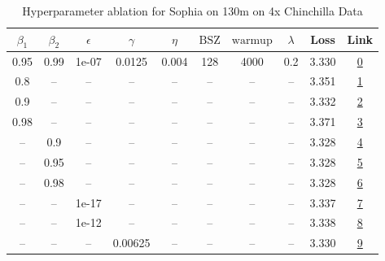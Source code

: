 \begin{table}[H]
\centering
\caption{Hyperparameter ablation for Sophia on 130m on 4x Chinchilla Data}
\label{tab:ablation_sophia_130m_4}
\begin{tabular}{cccccccccc}
\toprule
$\beta_1$ & $\beta_2$ & $\epsilon$ & $\gamma$ & $\eta$ & $\mathrm{BSZ}$ & $\mathrm{warmup}$ & $\lambda$ & Loss & Link \\
\midrule
0.95 & 0.99 & 1e-07 & 0.0125 & 0.004 & 128 & 4000 & 0.2 & 3.330 & \href{https://wandb.ai/stanford-mercury/optimizer-scaling/runs/sweep-130m-10B-sophia420680lr0.004-wd0.2-minlr0-warmup4000-b10.9-95e0d1}{0} \\
\midrule
0.8 & -- & -- & -- & -- & -- & -- & -- & 3.351 & \href{https://wandb.ai/stanford-mercury/optimizer-scaling/runs/sweep-130m-10B-sophiam200bcelr0.004-wd0.2-minlr0-warmup4000-b10.-64829e}{1} \\
0.9 & -- & -- & -- & -- & -- & -- & -- & 3.332 & \href{https://wandb.ai/stanford-mercury/optimizer-scaling/runs/sweep-130m-10B-sophiamb9ea0dlr0.004-wd0.2-minlr0-warmup4000-b10.-05ae6d}{2} \\
0.98 & -- & -- & -- & -- & -- & -- & -- & 3.371 & \href{https://wandb.ai/stanford-mercury/optimizer-scaling/runs/sweep-130m-10B-sophiam2761c5lr0.004-wd0.2-minlr0-warmup4000-b10.-5683e6}{3} \\
-- & 0.9 & -- & -- & -- & -- & -- & -- & 3.328 & \href{https://wandb.ai/stanford-mercury/optimizer-scaling/runs/sweep-130m-10B-sophiamc45a60lr0.004-wd0.2-minlr0-warmup4000-b10.-c9c782}{4} \\
-- & 0.95 & -- & -- & -- & -- & -- & -- & 3.328 & \href{https://wandb.ai/stanford-mercury/optimizer-scaling/runs/sweep-130m-10B-sophiamba4c53lr0.004-wd0.2-minlr0-warmup4000-b10.-80e6d8}{5} \\
-- & 0.98 & -- & -- & -- & -- & -- & -- & 3.328 & \href{https://wandb.ai/stanford-mercury/optimizer-scaling/runs/sweep-130m-10B-sophiam0657f9lr0.004-wd0.2-minlr0-warmup4000-b10.-e83579}{6} \\
-- & -- & 1e-17 & -- & -- & -- & -- & -- & 3.337 & \href{https://wandb.ai/stanford-mercury/optimizer-scaling/runs/sweep-130m-10B-sophiam98a019lr0.004-wd0.2-minlr0-warmup4000-b10.-edcb0a}{7} \\
-- & -- & 1e-12 & -- & -- & -- & -- & -- & 3.338 & \href{https://wandb.ai/stanford-mercury/optimizer-scaling/runs/sweep-130m-10B-sophiame63af6lr0.004-wd0.2-minlr0-warmup4000-b10.-d35185}{8} \\
-- & -- & -- & 0.00625 & -- & -- & -- & -- & 3.330 & \href{https://wandb.ai/stanford-mercury/optimizer-scaling/runs/sweep-130m-10B-sophiamb10b9alr0.004-wd0.2-minlr0-warmup4000-b10.-4aa147}{9} \\

\end{tabular}
\end{table}
